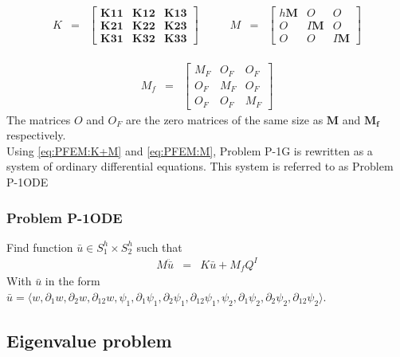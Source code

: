 \documentclass[../../main.tex]{subfiles}
\begin{document}
\begin{eqnarray}
	\begin{aligned}
		K & = &
		\begin{bmatrix}
			\mathbf{K11} & \mathbf{K12} & \mathbf{K13}\\
			\mathbf{K21} & \mathbf{K22} & \mathbf{K23}\\
			\mathbf{K31} & \mathbf{K32} & \mathbf{K33}
		\end{bmatrix}
	\end{aligned}
	\ \ \ \ \ \ \ \ \
	\begin{aligned}
		M & = &
		\begin{bmatrix}
			h\mathbf{M} & {O} & {O}\\
			{O} & I\mathbf{M} & {O}\\
			{O} & {O} & I\mathbf{M}
		\end{bmatrix}\label{3DB_23}
	\end{aligned}\label{eq:PFEM:K+M}
\end{eqnarray}


\begin{eqnarray}
	M_f & = &
	\begin{bmatrix}
		{M_F} & {O_F} & {O_F}\\
		{O_F} & {M_F} & {O_F}\\
		{O_F} & {O_F} & {M_F}
	\end{bmatrix}\label{eq:PFEM:M}
\end{eqnarray}
The matrices ${O}$ and ${O_F}$ are the zero matrices of the same size as $\mathbf{M}$ and $\mathbf{M_f}$ respectively.\\


Using \eqref{eq:PFEM:K+M} and \eqref{eq:PFEM:M}, Problem P-1G is rewritten as a system of ordinary differential equations. This system is referred to as Problem P-1ODE
\subsubsection{Problem P-1ODE}
Find function $\bar{u} \in S_1^h\times S_2^h$ such that
\begin{eqnarray}
	M\ddot{\bar{u}} & = & K\bar{u} + M_{f}Q^I \label{Plate_FEM_M}
\end{eqnarray}
With $\bar{u}$ in the form $\bar{u} = \langle w, \partial_1 w, \partial_2 w, \partial_{12} w, \psi_1, \partial_1 \psi_1, \partial_2 \psi_1, \partial_{12} \psi_1, \psi_2, \partial_1 \psi_2, \partial_2 \psi_2, \partial_{12} \psi_2 \rangle$.

\subsection{Eigenvalue problem}
\end{document}

